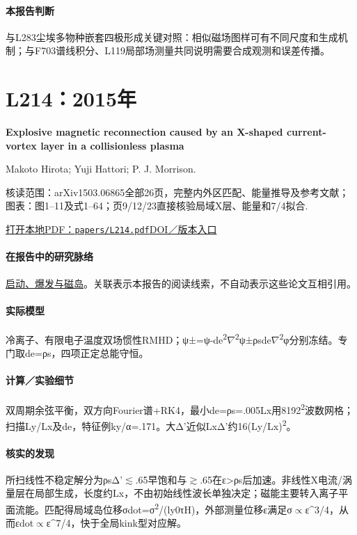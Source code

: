 \documentclass[UTF8,a4paper,11pt,openany,fontset=fandol]{ctexbook}
\begin{document}
\paragraph{本报告判断}与L283尘埃多物种嵌套四极形成关键对照：相似磁场图样可有不同尺度和生成机制；与F703谱线积分、L119局部场测量共同说明需要合成观测和误差传播。

\section{L214：2015年}\label{paper:L214}

\textbf{Explosive magnetic reconnection caused by an X-shaped current-vortex layer in a collisionless plasma}\citep{L214}\

Makoto Hirota;  Yuji Hattori;  P. J. Morrison.

\textsf{核读范围：}arXiv1503.06865全部26页，完整内外区匹配、能量推导及参考文献；\textsf{图表：}图1–11及式1–64；页9/12/23直接核验局域X层、能量和7/4拟合.

\href{run:../papers/L214.pdf}{打开本地PDF：\texttt{papers/L214.pdf}}\quad\href{https://doi.org/10.1063/1.4921329}{DOI／版本入口}

\paragraph{在报告中的研究脉络}\hyperref[story:onset]{启动、爆发与磁岛}。关联表示本报告的阅读线索，不自动表示这些论文互相引用。

\paragraph{实际模型}冷离子、有限电子温度双场惯性RMHD；ψ±=ψ-de\textsuperscript{2}\ensuremath{\nabla}\textsuperscript{2}ψ±ρsde\ensuremath{\nabla}\textsuperscript{2}φ分别冻结。专门取de=ρs，四项正定总能守恒。

\paragraph{计算／实验细节}双周期余弦平衡，双方向Fourier谱+RK4，最小de=ρs=.005Lx用8192\textsuperscript{2}波数网格；扫描Ly/Lx及de，特征例ky/α=.171。大Δ'近似LxΔ'约16(Ly/Lx)\textsuperscript{2}。

\paragraph{核实的发现}所扫线性不稳定解分为ρsΔ'\ensuremath{\lesssim}.65早饱和与\ensuremath{\gtrsim}.65在ε>ρs后加速。非线性X电流/涡量层在局部生成，长度约Lx，不由初始线性波长单独决定；磁能主要转入离子平面流能。匹配得局域岛位移σdot=σ\textsuperscript{2}/(ly0τH)，外部测量位移ε满足σ\ensuremath{\propto}ε\textasciicircum{}3/4，从而εdot\ensuremath{\propto}ε\textasciicircum{}7/4，快于全局kink型对应解。
\end{document}
